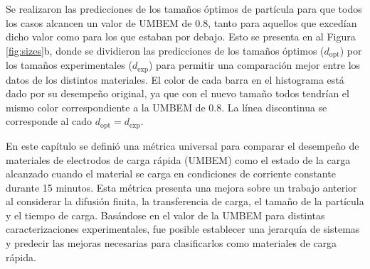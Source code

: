 Se realizaron las predicciones de los tamaños óptimos de partícula para que todos 
los casos alcancen un valor de UMBEM de 0.8, tanto para aquellos que excedían 
dicho valor como para los que estaban por debajo. Esto se presenta en al Figura 
\ref{fig:sizes}b, donde se dividieron las predicciones de los tamaños óptimos 
($d_{\text{opt}}$) por los tamaños experimentales ($d_{\text{exp}}$) para permitir
una comparación mejor entre los datos de los distintos materiales. El color de 
cada barra en el histograma está dado por su desempeño original, ya que con 
el nuevo tamaño todos tendrían el mismo color correspondiente a la UMBEM de 0.8.
La línea discontinua se corresponde al cado $d_{\text{opt}} = d_{\text{exp}}$.

En este capítulo se definió una métrica universal para comparar el desempeño
de materiales de electrodos de carga rápida (UMBEM) como el estado de la carga 
alcanzado cuando el material se carga en condiciones de corriente constante 
durante 15 minutos. Esta métrica presenta una mejora sobre un trabajo anterior al
considerar la difusión finita, la transferencia de carga, el tamaño de la 
partícula y el tiempo de carga. Basándose en el valor de la UMBEM para distintas 
caracterizaciones experimentales, fue posible establecer una jerarquía de 
sistemas y predecir las mejoras necesarias para clasificarlos como materiales de 
carga rápida.
